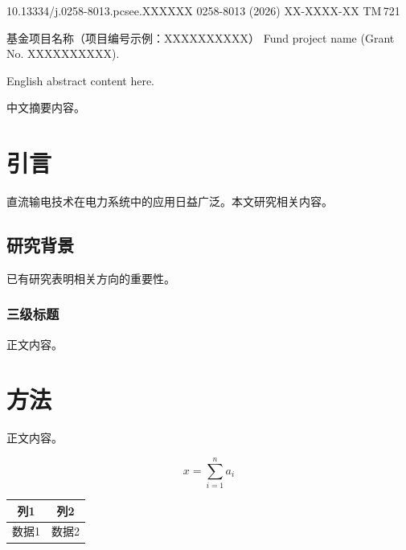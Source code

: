 \documentclass[UTF8,twoside,a4paper,fontset=none]{ctexart}
\begin{document}
\begin{cseefrontmatter}
\cseearticlemeta
  {10.13334/j.0258-8013.pcsee.XXXXXX}
  {0258-8013 (2026) XX-XXXX-XX}
  {TM\,721}
\end{cseefrontmatter}

\cseefund
  {基金项目名称（项目编号示例：XXXXXXXX\cseefundbreak XX）}
  {Fund project name (Grant No. XXXXXXXX\cseefundbreak XX).}

\begin{cseeabstractEN}
English abstract content here.
\end{cseeabstractEN}

\begin{cseeabstract}
中文摘要内容。
\end{cseeabstract}

\section{引言}
直流输电技术在电力系统中的应用日益广泛\cite{ref1,ref7}。本文研究相关内容。

\subsection{研究背景}
已有研究\cite{ref2,ref4}表明相关方向的重要性。

\subsubsection{三级标题}
正文内容。

\section{方法}
正文内容。

\begin{equation}
\label{eq:1}
x = \sum_{i=1}^{n} a_i
\end{equation}

\begin{table}[!ht]
  \centering
  \label{tab:1}
  \cseetabletext
  \begin{tabular}{cc}
    \toprule
    列1 & 列2 \\
    \midrule
    数据1 & 数据2 \\
    \bottomrule
  \end{tabular}
\end{table}
\end{document}
